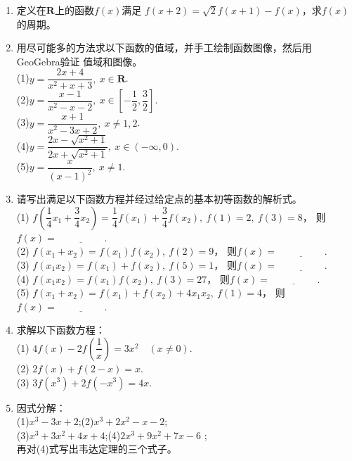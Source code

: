 \begin{enumerate}[label={\textbf{\arabic*.}},leftmargin=
    \inteval{\myenumleftmargin}pt]
\item 定义在$ \textbf{R} $上的函数$ f(x) $满足
$ f(x+2)=\sqrt{2}f(x+1)-f(x) $，求$ f(x) $的周期。

\item 用尽可能多的方法求以下函数的值域，并手工绘制函数图像，然后用GeoGebra验证
值域和图像。\\
(1)$ y=\dfrac{2x+4}{x^2+x+3},\ x\in \textbf{R} $. \\
(2)$ y=\dfrac{x-1}{x^2-x-2},\ x\in\left[-\dfrac{1}{2},
                            \dfrac{3}{2}\right] $. \\
(3)$ y=\dfrac{x+1}{x^2-3x+2},\ x\neq 1,2 $. \\
(4)$ y=\dfrac{2x-\sqrt{x^2+1}}{2x+\sqrt{x^2+1}},\ x\in (-\infty,0) $. \\
(5)$ y=\dfrac{x}{(x-1)^2},\ x\neq 1 $.

\item 请写出满足以下函数方程并经过给定点的基本初等函数的解析式。\\
(1) $ f\left(\dfrac{1}{4}x_1+\dfrac{3}{4}x_2\right)=\dfrac{1}{4}f(x_1)+
\dfrac{3}{4}f(x_2),\ f(1)=2,\ f(3)=8 $，
则$ f(x)=\underline{\hspace{2cm}} $. \\
(2) $ f(x_1+x_2)=f(x_1)f(x_2),\ f(2)=9 $，
则$ f(x)=\underline{\hspace{2cm}} $. \\
(3) $ f(x_1x_2)=f(x_1)+f(x_2),\ f(5)=1 $，
则$ f(x)=\underline{\hspace{2cm}} $. \\
(4) $ f(x_1x_2)=f(x_1)f(x_2),\ f(3)=27 $，
则$ f(x)=\underline{\hspace{2cm}} $. \\
(5) $ f(x_1+x_2)=f(x_1)+f(x_2)+4x_1x_2,\ f(1)=4 $，
则$ f(x)=\underline{\hspace{2cm}} $.

\item 求解以下函数方程：\\
(1) $ 4f(x)-2f(\dfrac{1}{x})=3x^2 \quad (x\neq 0) $. \\
(2) $ 2f(x)+f(2-x)=x $.  \\
(3) $ 3f(x^3)+2f(-x^3)=4x $. 

\item 因式分解：\\ (1)$ x^3-3x+2 $;\quad (2)$ x^3 + 2x^2 - x - 2 $;  \\
(3)$ x^3 + 3x^2 + 4x + 4 $;\quad (4)$ 2x^3 + 9x^2 + 7x - 6 $ ;\\
再对(4)式写出韦达定理的三个式子。


\end{enumerate}
